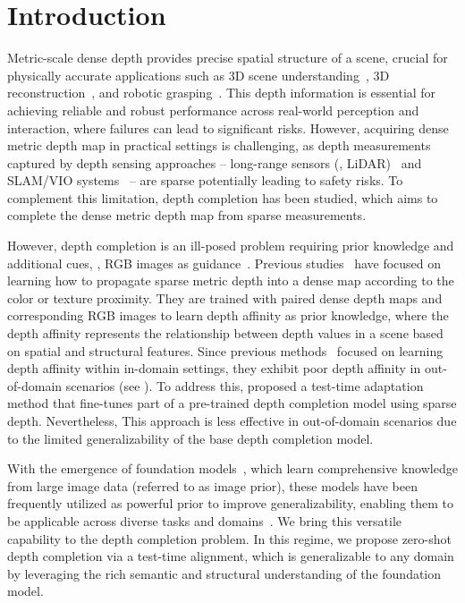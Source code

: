 \vspace{-1mm}
\section{Introduction}
\label{sec:intro} 
Metric-scale dense depth provides precise spatial structure of a scene, crucial for physically accurate applications such as 3D scene understanding~\cite{jiyeon2024unidvps}, 3D reconstruction~\cite{choe2021volumefusion}, and robotic grasping~\cite{viereck2017learning}. 
This depth information is essential for achieving reliable and robust performance across real-world perception and interaction, where 
failures can lead to significant risks.
However, acquiring dense metric depth map in practical settings is challenging, as depth measurements captured by depth sensing approaches -- long-range sensors (\eg, LiDAR)~\cite{Ma2017SparseToDense} 
and SLAM/VIO systems~\cite{wong2021unsupervised} -- are sparse 
potentially leading to safety risks.
To complement this limitation, depth completion has been studied, which aims to complete the dense metric depth map from sparse measurements.

However, depth completion is an ill-posed problem requiring prior knowledge and additional cues, \eg, RGB images as guidance~\cite{Ma2017SparseToDense, hu2021penet, guidenet, qiu2019deeplidar}. 
Previous studies~\cite{park2020nonlocal, zhang2023completionformer, wong2021unsupervised, wang2023lrru} 
have focused on learning how to propagate sparse metric depth into a dense map according to the color or texture proximity.
They are trained with paired dense depth maps and corresponding RGB images to learn 
depth affinity as prior knowledge, where
the depth affinity represents the relationship between depth values in a scene
based on spatial and structural features.
Since previous methods~\cite{zhang2023completionformer, wong2021unsupervised} focused on
learning depth affinity within in-domain settings, 
they exhibit poor depth affinity
in out-of-domain scenarios (see ).
To address this, \citet{park2024testtime} 
proposed a test-time adaptation method that fine-tunes part of a pre-trained depth completion model using sparse depth.
Nevertheless, This approach is less effective in out-of-domain scenarios due to the limited generalizability of the base depth completion model.

With the emergence of foundation models~\cite{caron2021emerging, rombach2022highresolution}, which learn comprehensive knowledge from large image data (referred to as image prior), these models have been frequently utilized as powerful prior to improve generalizability, enabling them to be applicable across diverse tasks and domains~\cite{lee2024dmp, yang2023diffusion, liu2023grounding}.
We bring this versatile capability to the depth completion problem.
In this regime, we propose 
zero-shot depth completion via a test-time alignment,
which is generalizable to any domain by leveraging the rich semantic and structural understanding of the foundation model.

